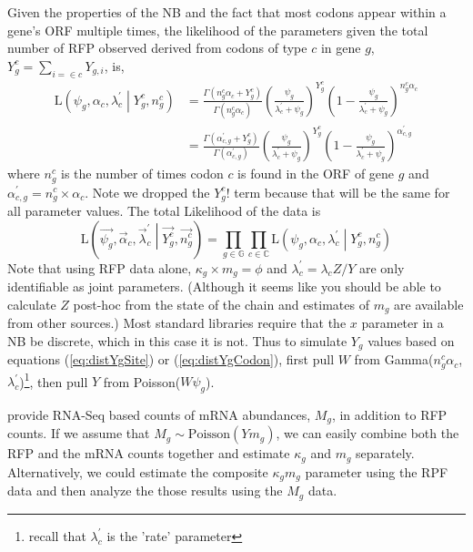\documentclass{article}
\newcommand{\alphac}{\ensuremath{{\alpha_c}}\xspace}
\newcommand{\alphacgprime}{\ensuremath{{\alpha_{c,g}^\prime}}\xspace}
\newcommand{\alphacvec}{\ensuremath{{\vec{\alpha}_c}}\xspace}
\newcommand{\lambdac}{\ensuremath{{\lambda_c}}\xspace}
\newcommand{\lambdacprime}{\ensuremath{{\lambda_c^\prime}}\xspace}
\newcommand{\lambdacprimevec}{\ensuremath{{\vec{\lambda}_c^\prime}}\xspace}
\newcommand{\ngc}{\ensuremath{{n_{g}^c}}\xspace}
\newcommand{\mg}{\ensuremath{{m_g}}\xspace}
\newcommand{\Mg}{\ensuremath{{M_g}}\xspace}
\newcommand{\psig}{\ensuremath{{\psi_g}}\xspace}
\newcommand{\kappag}{\ensuremath{{\kappa_{g}}}\xspace}
\newcommand{\Ztheta}{\ensuremath{{Z}}\xspace}
\newcommand{\Yg}{\ensuremath{{Y_{g}}}\xspace}
\newcommand{\Ytotal}{\ensuremath{{Y}}\xspace}
\newcommand{\Ygi}{\ensuremath{{Y_{g,i}}}\xspace}
\newcommand{\Ygc}{\ensuremath{{Y_{g}^c}}\xspace}
\newcommand{\Lik}{\ensuremath{\text{L}}\xspace}
\newcommand{\setG}{\ensuremath{\mathbb{G}}\xspace}
\newcommand{\setC}{\ensuremath{\mathbb{C}}\xspace}
\newcommand{\Ygcvec}{\ensuremath{{\Vec{\Ygc}}}\xspace}
\newcommand{\ngcvec}{\ensuremath{{\Vec{\ngc}}}\xspace}
\newcommand{\psigvec}{\ensuremath{{\Vec{\psig}}}\xspace}
\begin{document}
Given the properties of the NB \citep[p.~141]{ForbesEtAl2011} and the fact that most codons appear within a gene's ORF multiple times, the likelihood of the parameters given the total number of RFP observed derived from codons of type $c$ in gene $g$, $\Ygc = \sum_{i=\in c} \Ygi$, is,
\begin{align}
  \Lik\left(\psig, \alphac, \lambdacprime \middle| \Ygc, \ngc\right) &= \frac{\Gamma\left(\ngc \alphac + \Ygc\right)}{\Gamma\left(\ngc \alphac\right) } 
  \left(\frac{\psig}{\lambdacprime + \psig}\right)^\Ygc \left(1-\frac{\psig}{\lambdacprime + \psig}\right)^{\ngc \alphac}\\
\label{eq:distYgCodon}&= \frac{\Gamma\left(\alphacgprime + \Ygc\right)}{\Gamma\left(\alphacgprime\right)} 
  \left(\frac{\psig}{\lambdacprime + \psig}\right)^\Ygc \left(1-\frac{\psig}{\lambdacprime + \psig}\right)^{\alphacgprime}
\end{align}
where $\ngc$ is the number of times codon $c$ is found in the ORF of gene $g$ and $\alphacgprime = \ngc \times \alphac$.
Note we dropped the $\Ygc!$ term because that will be the same for all parameter values.
The total Likelihood of the data is
\begin{equation}
  \Lik\left(\psigvec, \alphacvec, \lambdacprimevec \middle| \Ygcvec, \ngcvec\right) = \prod_{g \in \setG} \prod_{c \in \setC}  \Lik\left(\psig, \alphac, \lambdacprime \middle| \Ygc, \ngc\right)
\end{equation}
Note that using RFP data alone, $\kappag \times \mg = \phi$ and $\lambdacprime = \lambdac \Ztheta/\Ytotal$ are only identifiable as joint parameters. 
(Although it seems like you should be able to calculate \Ztheta post-hoc from the state of the chain and estimates of \mg are available from other sources.)
Most standard libraries require that the $x$ parameter in a NB be discrete, which in this case it is not.
Thus to simulate \Yg values based on equations (\ref{eq:distYgSite}) or (\ref{eq:distYgCodon}), first pull $W$ from Gamma(\ngc \alphac, \lambdacprime)\footnote{recall that \lambdacprime is the 'rate' parameter}, then pull $Y$ from Poisson($W \psig$).
  
\citet{PopEtAl2014} provide RNA-Seq based counts of mRNA abundances, \Mg, in addition to RFP counts.
If we assume that $\Mg \sim \text{Poisson}(\Ytotal \mg)$, we can easily combine both the RFP and the mRNA counts together and estimate $\kappag$ and $\mg$ separately.
Alternatively, we could estimate the composite \kappag \mg parameter using the RPF data and then analyze the those results using the \Mg data.
\end{document}
